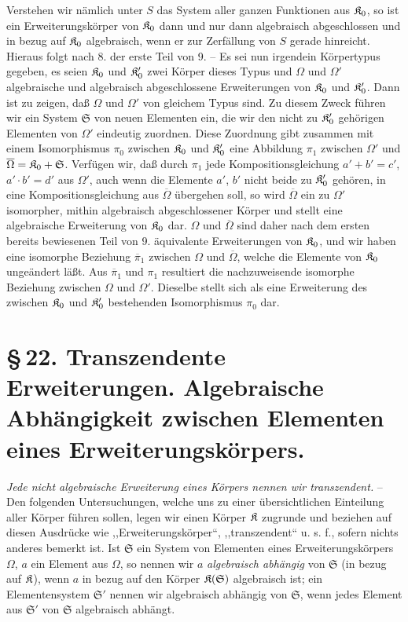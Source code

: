 Verstehen wir nämlich unter $S$ das System aller ganzen Funktionen aus $\mathfrak K_0$, so ist ein Erweiterungskörper von $\mathfrak K_0$ dann und nur dann algebraisch abgeschlossen und in bezug auf $\mathfrak K_0$ algebraisch, wenn er zur Zerfällung von $S$ gerade hinreicht. Hieraus folgt nach 8. der erste Teil von 9. -- Es sei nun irgendein Körpertypus gegeben, es seien $\mathfrak K_0$ und $\mathfrak K_0'$ zwei Körper dieses Typus und $\Omega$ und $\Omega'$ algebraische und algebraisch abgeschlossene Erweiterungen von $\mathfrak K_0$ und $\mathfrak K_0'$. Dann ist zu zeigen, daß $\Omega$ und $\Omega'$ von gleichem Typus sind. Zu diesem Zweck führen wir ein System $\mathfrak S$ von neuen Elementen ein, die wir den nicht zu $\mathfrak K_0'$ gehörigen Elementen von $\Omega'$ eindeutig zuordnen. Diese Zuordnung gibt zusammen mit einem Isomorphismus $\pi_0$ zwischen $\mathfrak K_0$ und $\mathfrak K_0'$ eine Abbildung $\pi_1$ zwischen $\Omega'$ und $\overline\Omega=\mathfrak K_0+\mathfrak S$. Verfügen wir, daß durch $\pi_1$ jede Kompositionsgleichung $a'+b'=c'$, $a'\cdot b'=d'$ aus $\Omega'$, auch wenn die Elemente $a'$, $b'$ nicht beide zu $\mathfrak K_0'$ gehören, in eine Kompositionsgleichung aus $\overline\Omega$ übergehen soll, so wird $\overline\Omega$ ein zu $\Omega'$ isomorpher, mithin algebraisch abgeschlossener Körper und stellt eine algebraische Erweiterung von $\mathfrak K_0$ dar. $\Omega$ und $\overline\Omega$ sind daher nach dem ersten bereits bewiesenen Teil von 9. äquivalente Erweiterungen von $\mathfrak K_0$, und wir haben eine isomorphe Beziehung $\overline\pi_1$ zwischen $\Omega$ und $\overline\Omega$, welche die Elemente von $\mathfrak K_0$ ungeändert läßt. Aus $\overline\pi_1$ und $\pi_1$ resultiert die nachzuweisende isomorphe Beziehung zwischen $\Omega$ und $\Omega'$. Dieselbe stellt sich als eine Erweiterung des zwischen $\mathfrak K_0$ und $\mathfrak K_0'$ bestehenden Isomorphismus $\pi_0$ dar.

\section*{\S\,22. Transzendente Erweiterungen. Algebraische Abhängigkeit zwischen Elementen eines Erweiterungskörpers.}

\emph{Jede nicht algebraische Erweiterung eines Körpers nennen wir transzendent.} -- Den folgenden Untersuchungen, welche uns zu einer übersichtlichen Einteilung aller Körper führen sollen, legen wir einen Körper $\mathfrak K$ zugrunde und beziehen auf diesen Ausdrücke wie ,,Erweiterungskörper``, ,,transzendent`` u. s. f., sofern nichts anderes bemerkt ist. Ist $\mathfrak S$ ein System von Elementen eines Erweiterungskörpers $\Omega$, $a$ ein Element aus $\Omega$, so nennen wir $a$ \emph{algebraisch abhängig} von $\mathfrak S$ (in bezug auf $\mathfrak K$), wenn $a$ in bezug auf den Körper $\mathfrak K(\mathfrak S)$ algebraisch ist; ein Elementensystem $\mathfrak S'$ nennen wir algebraisch abhängig von $\mathfrak S$, wenn jedes Element aus $\mathfrak S'$ von $\mathfrak S$ algebraisch abhängt.

